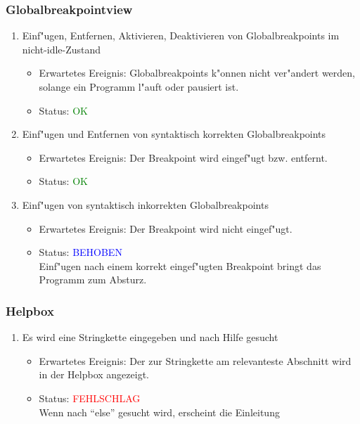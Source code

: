 \subsubsection{Globalbreakpointview}
\begin{enumerate}
\item Einf"ugen, Entfernen, Aktivieren, Deaktivieren von Globalbreakpoints im nicht-idle-Zustand
\begin{itemize}
\item Erwartetes Ereignis: Globalbreakpoints k"onnen nicht ver"andert werden, solange ein Programm l"auft oder pausiert ist. 
\item Status: \textcolor{green}{OK}
\end{itemize}
\item Einf"ugen und Entfernen von syntaktisch korrekten Globalbreakpoints
\begin{itemize}
\item Erwartetes Ereignis: Der Breakpoint wird eingef"ugt bzw. entfernt. 
\item Status: \textcolor{green}{OK}
\end{itemize}
\item Einf"ugen von syntaktisch inkorrekten Globalbreakpoints
\begin{itemize}
\item Erwartetes Ereignis: Der Breakpoint wird nicht eingef"ugt. 
\item Status: \textcolor{blue}{BEHOBEN} \\
Einf"ugen nach einem korrekt eingef"ugten Breakpoint bringt das Programm zum Absturz.
\end{itemize}
\end{enumerate}
\subsubsection{Helpbox}
\begin{enumerate}
\item Es wird eine Stringkette eingegeben und nach Hilfe gesucht
\begin{itemize}
\item Erwartetes Ereignis: Der zur Stringkette am relevanteste Abschnitt wird in der Helpbox angezeigt. 
\item Status: \textcolor{red}{FEHLSCHLAG} \\
Wenn nach "`else"' gesucht wird, erscheint die Einleitung
\end{itemize}
\end{enumerate}

